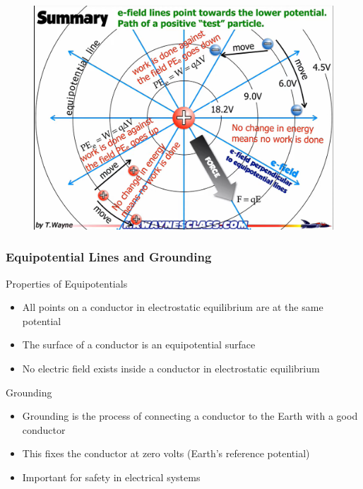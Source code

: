 \documentclass{beamer}
\begin{document}
\begin{frame}{}
    

\begin{figure}
    \centering
    \includegraphics[width=0.75\linewidth]{phys12-electrostatics-equipotential-lines.png}
\end{figure}
\end{frame}

\begin{frame}
    \frametitle{Equipotential Lines and Grounding}
    
    \begin{block}{Properties of Equipotentials}
        \begin{itemize}
            \item All points on a conductor in electrostatic equilibrium are at the same potential
            \item The surface of a conductor is an equipotential surface
            \item No electric field exists inside a conductor in electrostatic equilibrium
        \end{itemize}
    \end{block}

    
    \begin{block}{Grounding}
        \begin{itemize}
            \item Grounding is the process of connecting a conductor to the Earth with a good conductor
            \item This fixes the conductor at zero volts (Earth's reference potential)
            \item Important for safety in electrical systems
        \end{itemize}
    \end{block}
\end{frame}
\end{document}
